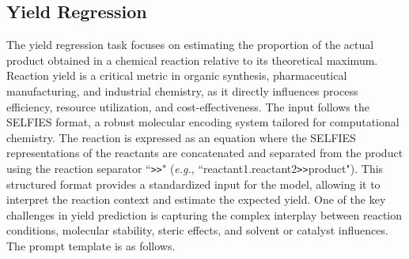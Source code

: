 \subsection{Yield Regression}
The yield regression task focuses on estimating the proportion of the actual product obtained in a chemical reaction relative to its theoretical maximum. Reaction yield is a critical metric in organic synthesis, pharmaceutical manufacturing, and industrial chemistry, as it directly influences process efficiency, resource utilization, and cost-effectiveness.
The input follows the SELFIES format, a robust molecular encoding system tailored for computational chemistry. The reaction is expressed as an equation where the SELFIES representations of the reactants are concatenated and separated from the product using the reaction separator ``{\tt >>}" (\emph{e.g.}, ``reactant1.reactant2{\tt >>}product"). This structured format provides a standardized input for the model, allowing it to interpret the reaction context and estimate the expected yield.
One of the key challenges in yield prediction is capturing the complex interplay between reaction conditions, molecular stability, steric effects, and solvent or catalyst influences. The prompt template is as follows.

